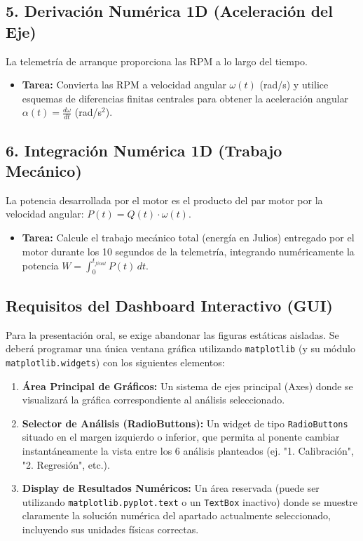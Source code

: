 	\subsection*{5. Derivación Numérica 1D (Aceleración del Eje)}
	
	La telemetría de arranque proporciona las RPM a lo largo del tiempo.
	
	\begin{itemize}
		\item \textbf{Tarea:} Convierta las RPM a velocidad angular $\omega(t)$ (rad/s) y utilice esquemas de diferencias finitas centrales para obtener la aceleración angular $\alpha(t) = \frac{d\omega}{dt}$ (rad/s$^2$).
	\end{itemize}
	
	\subsection*{6. Integración Numérica 1D (Trabajo Mecánico)}
	
	La potencia desarrollada por el motor es el producto del par motor por la velocidad angular: $P(t) = Q(t) \cdot \omega(t)$.
	
	\begin{itemize}
		\item \textbf{Tarea:} Calcule el trabajo mecánico total (energía en Julios) entregado por el motor durante los 10 segundos de la telemetría, integrando numéricamente la potencia $W = \int_{0}^{t_{final}} P(t) \, dt$.
	\end{itemize}
	
	\subsection*{Requisitos del Dashboard Interactivo (GUI)}
	
	Para la presentación oral, 
	se exige abandonar las figuras estáticas aisladas. 
	Se deberá programar una única ventana gráfica utilizando \texttt{matplotlib} (y su módulo \texttt{matplotlib.widgets}) con los siguientes elementos:
	
	\begin{enumerate}
		\item \textbf{Área Principal de Gráficos:} Un sistema de ejes principal (Axes) donde se visualizará la gráfica correspondiente al análisis seleccionado.
		\item \textbf{Selector de Análisis (RadioButtons):} Un widget de tipo \texttt{RadioButtons} situado en el margen izquierdo o inferior, que permita al ponente cambiar instantáneamente la vista entre los 6 análisis planteados (ej. "1. Calibración", "2. Regresión", etc.).
		\item \textbf{Display de Resultados Numéricos:} Un área reservada (puede ser utilizando \texttt{matplotlib.pyplot.text} o un \texttt{TextBox} inactivo) donde se muestre claramente la solución numérica del apartado actualmente seleccionado, incluyendo sus unidades físicas correctas.
	\end{enumerate}
	
